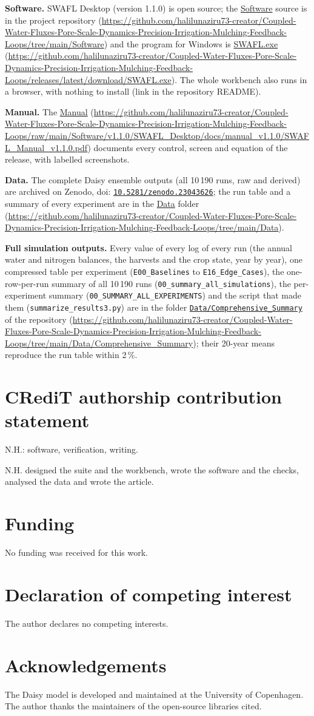 \documentclass[preprint,12pt]{elsarticle}
\newcommand{\doihl}[1]{doi: \href{https://doi.org/#1}{\nolinkurl{#1}}}
\newcommand{\repourl}{https://github.com/halilunaziru73-creator/Coupled-Water-Fluxes-Pore-Scale-Dynamics-Precision-Irrigation-Mulching-Feedback-Loops}
\newcommand{\dataurl}{\repourl/tree/main/Data}
\newcommand{\softurl}{\repourl/tree/main/Software}
\newcommand{\datalink}{\href{\dataurl}{Data}}
\newcommand{\softlink}{\href{\softurl}{Software}}
\newcommand{\manuallink}{\href{\manualurl}{Manual}}
\newcommand{\downloadlink}{\href{\exeurl}{SWAFL.exe}}
\newcommand{\manualurl}{https://github.com/halilunaziru73-creator/Coupled-Water-Fluxes-Pore-Scale-Dynamics-Precision-Irrigation-Mulching-Feedback-Loops/raw/main/Software/v1.1.0/SWAFL_Desktop/docs/manual_v1.1.0/SWAFL_Manual_v1.1.0.pdf}
\newcommand{\exeurl}{https://github.com/halilunaziru73-creator/Coupled-Water-Fluxes-Pore-Scale-Dynamics-Precision-Irrigation-Mulching-Feedback-Loops/releases/latest/download/SWAFL.exe}
\newcommand{\csurl}{https://github.com/halilunaziru73-creator/Coupled-Water-Fluxes-Pore-Scale-Dynamics-Precision-Irrigation-Mulching-Feedback-Loops/tree/main/Data/Comprehensive_Summary}
\newcommand{\cslink}{\href{\csurl}{\nolinkurl{Data/Comprehensive_Summary}}}
\newcommand{\csavail}{\par\smallskip\textbf{Full simulation outputs.} Every value of every log of every run (the annual water and nitrogen balances, the harvests and the crop state, year by year), one compressed table per experiment (\texttt{E00\_Baselines} to \texttt{E16\_Edge\_Cases}), the one-row-per-run summary of all 10\,190 runs (\texttt{00\_summary\_all\_simulations}), the per-experiment summary (\texttt{00\_SUMMARY\_ALL\_EXPERIMENTS}) and the script that made them (\texttt{summarize\_results3.py}) are in the folder \cslink{} of the repository (\url{\csurl}); their 20-year means reproduce the run table within 2\,\%.}
\newcommand{\suiteavail}{%
\textbf{Software.} SWAFL Desktop (version 1.1.0) is open source; the \softlink{} source is in the project repository (\url{\softurl}) and the program for Windows is \downloadlink{} (\url{\exeurl}). The whole workbench also runs in a browser, with nothing to install (link in the repository README).
\par\smallskip\textbf{Manual.} The \manuallink{} (\url{\manualurl}) documents every control, screen and equation of the release, with labelled screenshots.
\par\smallskip\textbf{Data.} The complete Daisy ensemble outputs (all 10\,190 runs, raw and derived) are archived on Zenodo, \doihl{10.5281/zenodo.23043626}; the run table and a summary of every experiment are in the \datalink{} folder (\url{\dataurl}).\csavail
}
\begin{document}
\suiteavail
\section*{CRediT authorship contribution statement}
N.H.: software, verification, writing.

N.H. designed the suite and the workbench, wrote the software and the checks, analysed the data and wrote the article.
\section*{Funding}
No funding was received for this work.

\section*{Declaration of competing interest}
The author declares no competing interests.


\section*{Acknowledgements}
The Daisy model is developed and maintained at the University of Copenhagen. The author thanks the maintainers of the open-source libraries cited.


\appendix
\end{document}
